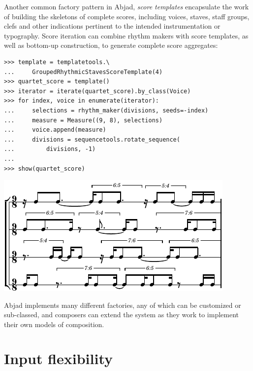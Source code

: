 \documentclass{article}
\begin{document}
Another common factory pattern in Abjad, \emph{score templates} encapsulate the
work of building the skeletons of complete scores, including voices, staves,
staff groups, clefs and other indications pertinent to the intended
instrumentation or typography. Score iteration can combine rhythm makers with
score templates, as well as bottom-up construction, to generate complete score
aggregates:

\begin{lstlisting}
>>> template = templatetools.\
...     GroupedRhythmicStavesScoreTemplate(4)
>>> quartet_score = template()
>>> iterator = iterate(quartet_score).by_class(Voice)
>>> for index, voice in enumerate(iterator):
...     selections = rhythm_maker(divisions, seeds=-index)
...     measure = Measure((9, 8), selections)
...     voice.append(measure)
...     divisions = sequencetools.rotate_sequence(
...         divisions, -1)
...
>>> show(quartet_score)
\end{lstlisting}
\includegraphics{assets/lilypond-4598fe78647d623cdf81100e0343874a.pdf}

\noindent Abjad implements many different factories, any of which can be
customized or sub-classed, and composers can extend the system as they work to
implement their own models of composition.

\section{Input flexibility} \label{sec:input-flexibility}
\end{document}
